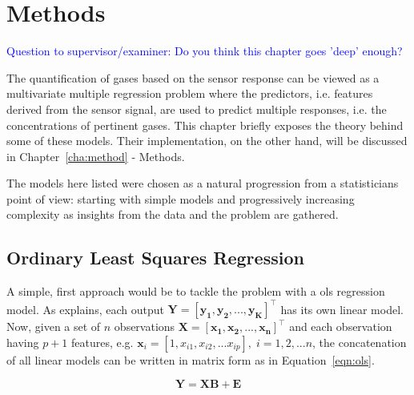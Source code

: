 
\chapter{Methods}
\label{cha:methods}

\textcolor{blue}{Question to supervisor/examiner: Do you think this chapter goes 'deep' enough?} 

The quantification of gases based on the sensor response can be viewed as a multivariate multiple regression problem where the predictors, i.e. features derived from the sensor signal, are used to predict multiple responses, i.e. the concentrations of pertinent gases. This chapter briefly exposes the theory behind some of these models. Their implementation, on the other hand, will be discussed in Chapter~\ref{cha:method} - Methods.

The models here listed were chosen as a natural progression from a statisticians point of view: starting with simple models and progressively increasing complexity as insights from the data and the problem are gathered.

\section{Ordinary Least Squares Regression}
\label{sec:linreg}

A simple, first approach would be to tackle the problem with a \acrfull{ols} regression model. As \cite{friedman2001} explains, each output  $\mathbf{Y = [y_1, y_2, ... , y_K]^\intercal} $ has its own linear model. Now, given a set of $n$ observations $\mathbf{X = [x_1, x_2, ..., x_n]^\intercal}$ and each observation having $p+1$ features, e.g. $\mathbf{x}_i = [1,x_{i1}, x_{i2}, ... x_{ip}], \; i = 1,2,...n$, the concatenation of all linear models can be written in matrix form as in Equation~\ref{eqn:ols}.

\begin{equation}
	\label{eqn:ols}
	\mathbf{Y = XB +  E}
\end{equation}

